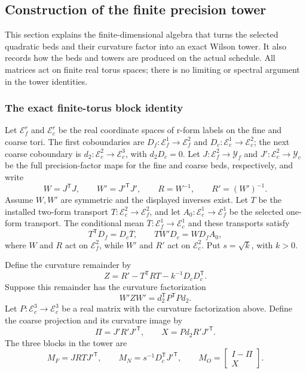 \subsection{Construction of the finite precision tower}
\label{sec:ex-lattice-rg-horizon-geometry}

This section explains the finite-dimensional algebra that turns the selected
quadratic beds and their curvature factor into an exact Wilson tower. It also
records how the beds and towers are produced on the actual schedule. All
matrices act on finite real torus spaces; there is no limiting or spectral
argument in the tower identities.

\subsubsection{The exact finite-torus block identity}
\label{subsec:ex-lattice-rg-roll}

Let $\mathcal E_f^r$ and $\mathcal E_c^r$ be the real coordinate spaces of
r-form labels on the fine and coarse tori. The first coboundaries are
$D_f: \mathcal E_f^1\to\mathcal E_f^2$ and
$D_c: \mathcal E_c^1\to\mathcal E_c^2$; the next coarse coboundary is
$d_2: \mathcal E_c^2\to\mathcal E_c^3$, with $d_2D_c=0$. Let
$J: \mathcal E_f^2\to\mathcal Y_f$ and
$J': \mathcal E_c^2\to\mathcal Y_c$ be the full precision-factor maps
for the fine and coarse beds, respectively, and write
\[
 W=J^{\mathsf T}J,\qquad W'=J'^{\mathsf T}J',\qquad
 R=W^{-1},\qquad R'=(W')^{-1}.
\]
Assume $W,W'$ are symmetric and the displayed inverses exist. Let $T$ be
the installed two-form transport $T:\mathcal E_c^2\to\mathcal E_f^2$,
and let $A_0:\mathcal E_c^1\to\mathcal E_f^1$ be the selected one-form
transport. The conditional mean $\overline T:\mathcal E_f^1\to\mathcal E_c^1$
and these transports satisfy
\begin{equation}
 T^{\mathsf T}D_f=D_c\overline T,
 \qquad TW'D_c=WD_fA_0,
 \label{eq:ex-lattice-horizon-diagonal}
\end{equation}
where $W$ and $R$ act on $\mathcal E_f^2$, while $W'$ and $R'$
act on $\mathcal E_c^2$. Put $s=\sqrt{k}$, with $k>0$.

Define the curvature remainder by
\begin{equation}
 Z=R'-T^{\mathsf T}RT-k^{-1}D_cD_c^{\mathsf T}.
 \label{eq:ex-lattice-horizon-defect}
\end{equation}
Suppose this remainder has the curvature factorization
\begin{equation}
 W'ZW'=d_2^{\mathsf T}P^{\mathsf T}P d_2.
 \label{eq:ex-lattice-horizon-bleep}
\end{equation}
Let $P:\mathcal E_c^3\to\mathcal E_c^3$ be a real matrix with the
curvature factorization above. Define the coarse projection and its
curvature image by
\[
 \Pi=J'R'J'^{\mathsf T},\qquad
 X=P d_2R'J'^{\mathsf T}.
\]
The three blocks in the tower are
\begin{equation}
 M_F=JRTJ'^{\mathsf T},\qquad
 M_N=s^{-1}D_c^{\mathsf T}J'^{\mathsf T},\qquad
 M_O=\begin{bmatrix}I-\Pi\\X\end{bmatrix}.
 \label{eq:ex-lattice-horizon-blocks}
\end{equation}

